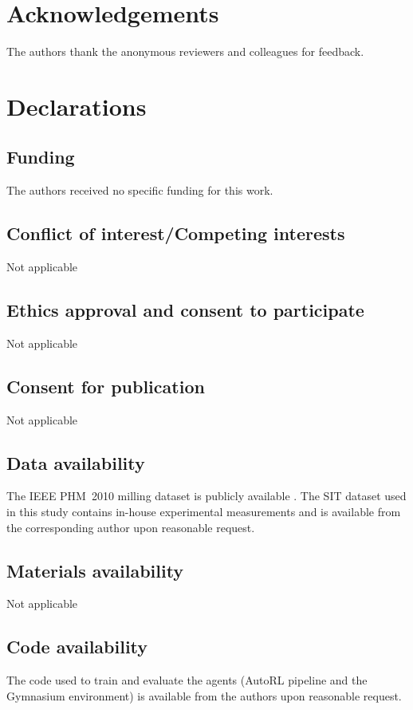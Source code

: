 \documentclass[sn-basic]{sn-jnl} %
\begin{document}
\section*{Acknowledgements}
The authors thank the anonymous reviewers and colleagues for feedback.

\section*{Declarations}

\subsection*{Funding}
The authors received no specific funding for this work.

\subsection*{Conflict of interest/Competing interests}
Not applicable

\subsection*{Ethics approval and consent to participate}
Not applicable

\subsection*{Consent for publication}
Not applicable

\subsection*{Data availability}
The IEEE PHM~2010 milling dataset is publicly available \cite{PHMdata2010}. The SIT dataset used in this study contains in-house experimental measurements and is available from the corresponding author upon reasonable request.

\subsection*{Materials availability}
Not applicable

\subsection*{Code availability}
The code used to train and evaluate the agents (AutoRL pipeline and the Gymnasium environment) is available from the authors upon reasonable request.
\end{document}
